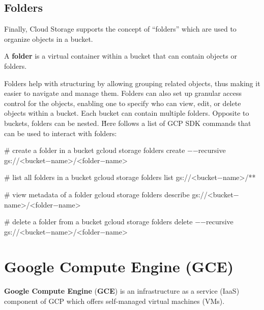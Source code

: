 \subsection{Folders}

Finally, Cloud Storage supports the concept of ``folders'' which are used to organize objects in a bucket.

\bd[Folder]
A \textbf{folder} is a virtual container within a bucket that can contain objects or folders.
\ed

Folders help with structuring by allowing grouping related objects, thus making it easier to navigate and manage them.
Folders can also set up granular access control for the objects, enabling one to specify who can view, edit, or
delete objects within a bucket. Each bucket can contain multiple folders. Opposite to buckets, folders can be nested. \v

Here follows a list of GCP SDK commands that can be used to interact with folders:
\begin{bash}
# create a folder in a bucket
gcloud storage folders create $-$$-$recursive gs://<bucket$-$name>/<folder$-$name>
\end{bash}

\begin{bash}
# list all folders in a bucket
gcloud storage folders list gs://<bucket$-$name>/**
\end{bash}

\begin{bash}
# view metadata of a folder
gcloud storage folders describe gs://<bucket$-$name>/<folder$-$name>
\end{bash}

\begin{bash}
# delete a folder from a bucket
gcloud storage folders delete $-$$-$recursive gs://<bucket$-$name>/<folder$-$name>
\end{bash}

\section{Google Compute Engine (GCE)}

\textbf{Google Compute Engine} (\textbf{GCE}) is an infrastructure as a service (IaaS) component of GCP which offers
self-managed virtual machines (VMs).
\ed

